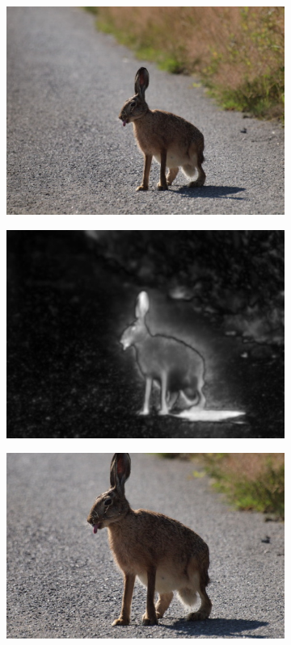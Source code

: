 \begin{figure}[H]
    \centering
    \begin{subfigure}{0.32\textwidth}
      \centering
      \includegraphics[scale=1.0]{obrazky/ORIG31.jpg}
    \end{subfigure}
    \begin{subfigure}{.32\textwidth}
      \centering
      \includegraphics[scale=1.0]{obrazky/ittiSM31.jpg}
    \end{subfigure}
    \begin{subfigure}{.32\textwidth}
      \centering
      \includegraphics[scale=1.0]{obrazky/cropSuh31.jpg}

\end{subfigure}
\end{figure}
